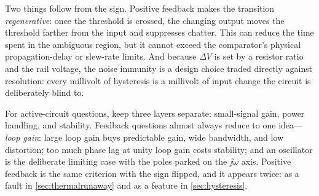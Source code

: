 Two things follow from the sign. Positive feedback makes the transition
\emph{regenerative}: once the threshold is crossed, the changing output moves the
threshold farther from the input and suppresses chatter. This can reduce the time
spent in the ambiguous region, but it cannot exceed the comparator's physical
propagation-delay or slew-rate limits. And because \(\Delta V\) is set by a resistor
ratio and the rail voltage, the noise immunity is a design choice traded directly
against resolution: every millivolt of hysteresis is a millivolt of input change the
circuit is deliberately blind to.

\begin{exambox}
For active-circuit questions, keep three layers separate: small-signal gain,
power handling, and stability. Feedback questions almost always reduce to one
idea---\emph{loop gain}: large loop gain buys predictable gain, wide bandwidth,
and low distortion; too much phase lag at unity loop gain costs stability; and an
oscillator is the deliberate limiting case with the poles parked on the
\(\jj\omega\) axis. Positive feedback is the same criterion with the sign flipped, and
it appears twice: as a fault in \cref{sec:thermalrunaway} and as a feature in
\cref{sec:hysteresis}.
\end{exambox}
